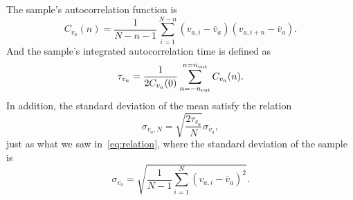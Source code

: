 \Answer{}
The sample's autocorrelation function is
%
\begin{equation}\label{eq:sampleautocor}
    C_{v_a}(n) = \frac{ 1 }{ N - n - 1 }
    \sum_{i=1}^{N-n} (v_{a,i} - \bar{v}_a) (v_{a,i + n} - \bar{v}_a).
\end{equation}
%
And the sample's integrated autocorrelation time is defined as
%
\begin{equation}\label{eq:sampletau}
    \tau_{v_a} = \frac{ 1 }{ 2 C_{v_a}(0) }
    \sum_{n=-n_\textnormal{cut}}^{n=n_\textnormal{cut}} C_{v_a}(n).
\end{equation}
%
In addition, the standard deviation of the mean satisfy the relation
%
\begin{equation}
    \sigma_{\bar{v}_a,N} = \sqrt{\frac{ 2\tau_{v_a} }{ N }} \sigma_{v_a},
\end{equation}
%
just as what we saw in~\eqref{eq:relation}, where the standard deviation of the sample is
%
\begin{equation}
    \sigma_{v_a} = \sqrt{\frac{ 1 }{ N - 1 } \sum_{i=1}^N (v_{a,i} - \bar{v}_a)^2}.
\end{equation}
